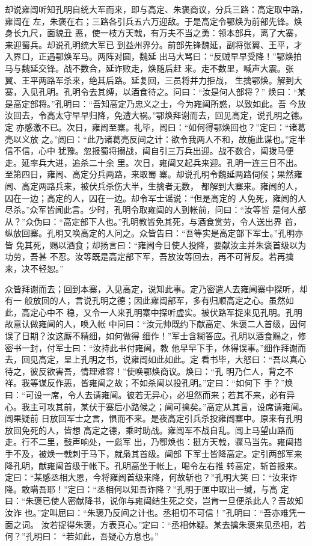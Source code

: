 却说雍闿听知孔明自统大军而来，即与高定、朱褒商议，分兵三路：高定取中路，雍闿在
左，朱褒在右；三路各引兵五六万迎敌。于是高定令鄂焕为前部先锋。焕身长九尺，面貌丑
恶，使一枝方天戟，有万夫不当之勇：领本部兵，离了大寨，来迎蜀兵。却说孔明统大军已
到益州界分。前部先锋魏延，副将张翼、王平，才入界口，正遇鄂焕军马。两阵对圆，魏延
出马大骂曰：“反贼早早受降！”鄂焕拍马与魏延交锋。战不数合，延诈败走，焕随后赶
来。走不数里，喊声大震。张翼、王平两路军杀来，绝其后路。延复回，三员将并力拒战，
生擒鄂焕。解到大寨，入见孔明。孔明令去其缚，以酒食待之。问曰：“汝是何人部将？”
焕曰：“某是高定部将。”孔明曰：“吾知高定乃忠义之士，今为雍闿所惑，以致如此。吾
今放汝回去，令高太守早早归降，免遭大祸。”鄂焕拜谢而去，回见高定，说孔明之德。定
亦感激不已。次日，雍闿至寨。礼毕，闿曰：“如何得鄂焕回也？”定曰：“诸葛亮以义放
之。”闿曰：“此乃诸葛亮反间之计：欲令我两人不和，故施此谋也。”定半信不信，心中
犹豫。忽报蜀将搦战，闿自引三万兵出迎。战不数合，闿拨马便走。延率兵大进，追杀二十余
里。次日，雍闿又起兵来迎。孔明一连三日不出。至第四日，雍闿、高定分兵两路，来取蜀
寨。却说孔明令魏延两路伺候；果然雍闿、高定两路兵来，被伏兵杀伤大半，生擒者无数，
都解到大寨来。雍闿的人，囚在一边；高定的人，囚在一边。却令军士谣说：“但是高定的
人免死，雍闿的人尽杀。”众军皆闻此言。少时，孔明令取雍闿的人到帐前，问曰：“汝等皆
是何人部从？”众伪曰：“高定部下人也。”孔明教皆免其死，与酒食赏劳，令人送出界
首，纵放回寨。孔明又唤高定的人问之。众皆告曰：“吾等实是高定部下军士。”孔明亦皆
免其死，赐以酒食；却扬言曰：“雍闿今日使人投降，要献汝主并朱褒首级以为功劳，吾甚
不忍。汝等既是高定部下军，吾放汝等回去，再不可背反。若再擒来，决不轻恕。”

众皆拜谢而去；回到本寨，入见高定，说知此事。定乃密遣人去雍闿寨中探听，却有一
般放回的人，言说孔明之德；因此雍闿部军，多有归顺高定之心。虽然如此，高定心中不
稳，又令一人来孔明寨中探听虚实。被伏路军捉来见孔明。孔明故意认做雍闿的人，唤入帐
中问曰：“汝元帅既约下献高定、朱褒二人首级，因何误了日期？汝这厮不精细，如何做得
细作！”军士含糊答应。孔明以酒食赐之，修密书一封，付军士曰：“汝持此书付雍闿，教
他早早下手，休得误事。”细作拜谢而去，回见高定，呈上孔明之书，说雍闿如此如此。定
看书毕，大怒曰：“吾以真心待之，彼反欲害吾，情理难容！”使唤鄂焕商议。焕曰：“孔
明乃仁人，背之不祥。我等谋反作恶，皆雍闿之故；不如杀闿以投孔明。”定曰：“如何下
手？”焕曰：“可设一席，令人去请雍闿。彼若无异心，必坦然而来；若其不来，必有异
心。我主可攻其前，某伏于寨后小路候之；闿可擒矣。”高定从其言，设席请雍闿。闿果疑前
日放回军士之言，惧而不来。是夜高定引兵杀投雍闿寨中。原来有孔明放回免死的人，皆想
高定之德，乘时助战。雍闿军不战自乱。闿上马望山路而走。行不二里，鼓声响处，一彪军
出，乃鄂焕也：挺方天戟，骤马当先。雍闿措手不及，被焕一戟刺于马下，就枭其首级。闿部
下军士皆降高定。定引两部军来降孔明，献雍闿首级于帐下。孔明高坐于帐上，喝令左右推
转高定，斩首报来。定曰：“某感丞相大恩，今将雍闿首级来降，何故斩也？”孔明大笑
曰：“汝来诈降。敢瞒吾耶！”定曰：“丞相何以知吾诈降？”孔明于匣中取出一缄，与高
定曰：“朱褒已使人密献降书，说你与雍闿结生死之交，岂肯一旦便杀此人？吾故知汝诈
也。”定叫屈曰：“朱褒乃反间之计也。丞相切不可信！”孔明曰：“吾亦难凭一面之词。
汝若捉得朱褒，方表真心。”定曰：“丞相休疑。某去擒朱褒来见丞相，若何？”孔明曰：
“若如此，吾疑心方息也。”

